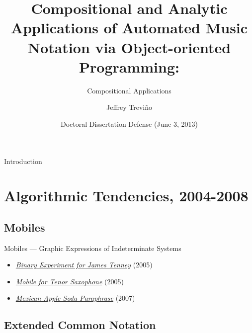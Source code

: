 \documentclass{beamer}
\title[] %
{Compositional and Analytic Applications of Automated Music Notation via Object-oriented Programming:}
\subtitle
{Compositional Applications}
\author[Trevi\~{n}o, Jeffrey] %
{Jeffrey Trevi\~{n}o\inst{1}}
\institute[University of California, San Diego] %
{
  \inst{1}%
  Department of Music\\
  University of California, San Diego}
\date[CFP 2003] %
{Doctoral Dissertation Defense (June 3, 2013)}
\begin{document}
\begin{frame}
  \titlepage
\end{frame}

\begin{frame}{Introduction}
  \tableofcontents
\end{frame}





\section{Algorithmic Tendencies, 2004-2008}

\subsection{Mobiles}
\begin{frame}{Mobiles --- Graphic Expressions of Indeterminate Systems}
  \begin{itemize}
  \item
    \emph{\href{binaryExperiment}{Binary Experiment for James Tenney}} (2005)
    \pause
    
   \item
     \emph{\href{mobileForSax}{Mobile for Tenor Saxophone}} (2005)
    \pause
   \item
    \emph{\href{sodaParaphrase}{Mexican Apple Soda Paraphrase}} (2007)
  \end{itemize}
\end{frame}

\subsection{Extended Common Notation}
\end{document}
